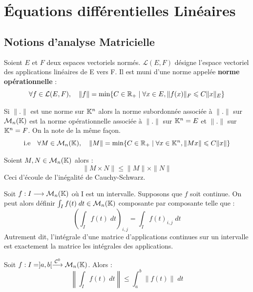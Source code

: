 
\section{Équations différentielles Linéaires}


\subsection{Notions d'analyse Matricielle}

Soient $E$ et $F$ deux espaces vectoriels normés. $ \mathcal{L}(E,F)$ désigne l'espace vectoriel des applications linéaires 
de E vers F. Il est muni d'une norme appelée \textbf{norme opérationnelle} : 
    \[ \forall f \in \mathcal{L}(E,F), \quad \| f \| = \min \{ C \in \mathbb{R}_+ \; | \; \forall x \in E, \| f(x) \|_F \leqslant C \| x \|_E \} \]

\begin{definition}
    Si $\|.\|$ est une norme sur $\mathbb{K}^n$ alors la norme subordonnée associée à $\|.\|$ sur $ \mathcal{M}_n(\mathbb{K})$ est 
    la norme opérationnelle associée à $\|.\|$ sur $\mathbb{K}^n = E$ et $\|.\|$ sur $\mathbb{K}^n = F$. On la note de la même façon. 
    \[ \text{i.e} \quad \forall M \in \mathcal{M}_n(\mathbb{K}), \quad  \| M \| = \min \{ C \in \mathbb{R}_+ \; | \; \forall x \in \mathbb{K}^n, \| Mx \| \leqslant C \| x \| \} \]
\end{definition}

\begin{proposition}
    Soient $M,N \in \mathcal{M}_n(\mathbb{K})$ alors :
        \[ \| M \times N \| \leqslant \|M\| \times \|N\| \]
    Ceci d'écoule de l'inégalité de Cauchy-Schwarz. 
\end{proposition}

\begin{remark}
    Soit $f : I \longrightarrow \mathcal{M}_n(\mathbb{K})$ où I est un intervalle. Supposons que $f$ soit continue. 
    On peut alors définir $ \int_I f(t) \; dt \in \mathcal{M}_n(\mathbb{K})$ composante par composante telle que :
        \[ \left( \int_I f(t) \; dt \right)_{i,j} = \int_I f(t)_{i,j} \; dt \] 
    Autrement dit, l'intégrale d'une matrice d'applications continues sur un intervalle est exactement la matrice 
    les intégrales des applications. 
\end{remark}

\begin{proposition}
    Soit $f : I = ]a,b[ \overset{ \mathcal{C}^0}{\longrightarrow} \mathcal{M}_n(\mathbb{K})$. Alors :
        \[ \left\| \int_I f(t) \; dt \right\| \leqslant \int_{a}^{b} \left\| f(t) \right\| \; dt \] 
\end{proposition}

